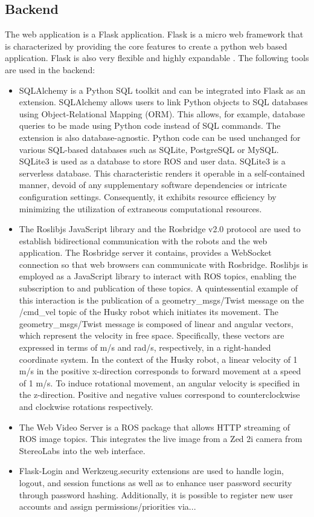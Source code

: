 \documentclass[conference]{IEEEtran}
\begin{document}
\subsection{Backend}
The web application is a Flask application. Flask is a micro web framework that is characterized by providing the core features to create a python web based application. 
Flask is also very flexible and highly expandable \cite{flasksqlite}. The following tools are used in the backend:
\begin{itemize}
\item SQLAlchemy is a Python SQL toolkit and can be integrated into Flask as an extension. SQLAlchemy allows users to link Python objects to SQL databases using Object-Relational Mapping (ORM). This allows, for example, database queries to be made using Python code instead of SQL commands. The extension is also database-agnostic. 
Python code can be used unchanged for various SQL-based databases such as SQLite, PostgreSQL or MySQL. 
SQLite3 is used as a database to store ROS and user data. SQLite3 is a serverless database. This characteristic renders it operable in a self-contained manner, devoid of any supplementary software dependencies or intricate configuration settings. Consequently, it exhibits resource efficiency by minimizing the utilization of extraneous computational resources.
\item The Roslibjs JavaScript library and the Rosbridge v2.0 protocol are used to establish bidirectional communication with the robots and the web application. The Rosbridge server it contains, provides a WebSocket connection so that web browsers can communicate with Rosbridge.
Roslibjs is employed as a JavaScript library to interact with ROS topics, enabling the subscription to and publication of these topics. A quintessential example of this interaction is the publication of a geometry\_msgs/Twist message on the /cmd\_vel topic of the Husky robot which initiates its movement.
The geometry\_msgs/Twist message is composed of linear and angular vectors, which represent the velocity in free space. Specifically, these vectors are expressed in terms of m/s and rad/s, respectively, in a right-handed coordinate system.
In the context of the Husky robot, a linear velocity of 1 m/s in the positive x-direction corresponds to forward movement at a speed of 1 m/s. To induce rotational movement, an angular velocity is specified in the z-direction. Positive and negative values correspond to counterclockwise and clockwise rotations respectively.
\item The Web Video Server is a ROS package that allows HTTP streaming of ROS image topics. This integrates the live image from a Zed 2i camera from StereoLabs into the web interface.
\item Flask-Login and Werkzeug.security extensions are used to handle login, logout, and session functions as well as to enhance user password security through password hashing. Additionally, it is possible to register new user accounts and assign permissions/priorities via...
\end{itemize}
\end{document}
